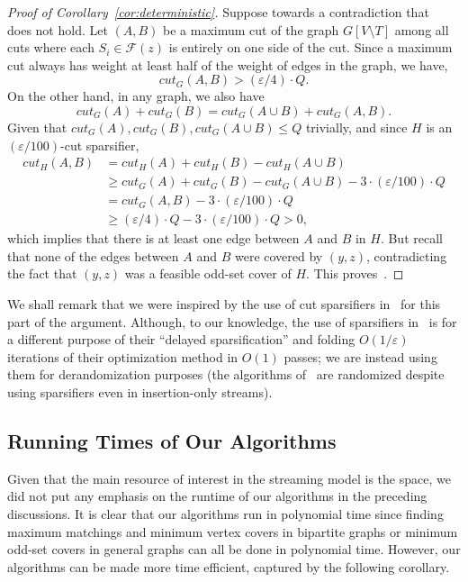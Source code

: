\documentclass{article}
\renewcommand{\leq}{\leqslant}
\renewcommand{\geq}{\geqslant}
\newcommand{\eps}{\varepsilon}
\begin{document}
\begin{proof}[Proof of Corollary~\ref{cor:deterministic}]
Suppose towards a contradiction that~ does not hold. Let $(A,B)$ be a maximum cut of the graph $G[V \setminus T]$ among all cuts where each $S_i \in \mathcal{F}(z)$ is entirely on one side of the cut. 
Since a maximum cut always has weight at least half of the weight of edges in the graph, we have, 
\[
	cut_G(A,B) > (\eps/4) \cdot Q.  
\]
On the other hand, in any graph, we also have
\[
	cut_G(A) + cut_G(B) = cut_G(A \cup B) + cut_G(A, B). 
\]
Given that $cut_G(A),cut_G(B),cut_G(A \cup B) \leq Q$ trivially, and since $H$ is an $(\eps/100)$-cut sparsifier, 
\begin{align*}
	cut_H(A,B) &= cut_H(A) + cut_H(B) - cut_H(A \cup B) \\
	&\geq cut_G(A) + cut_G(B) - cut_G(A \cup B) - 3 \cdot (\eps/100) \cdot Q \\
	&= cut_G(A,B) - 3 \cdot (\eps/100) \cdot Q \\
	&\geq (\eps/4) \cdot Q - 3 \cdot (\eps/100) \cdot Q > 0,
\end{align*}
which implies that there is at least one edge between $A$ and $B$ in $H$. But recall that none of the edges between $A$ and $B$ were covered by $(y,z)$, contradicting the fact that $(y,z)$ was a 
feasible odd-set cover of $H$. This proves~. 
\end{proof}


We shall remark that we were inspired by the use of cut sparsifiers in~\cite{AhnG15} for this part of the argument. Although, to our knowledge, the use of sparsifiers in~\cite{AhnG15} is for a different purpose
of their ``delayed sparsification'' and folding $O(1/\eps)$ iterations of their optimization method in $O(1)$ passes; we are instead using them for derandomization purposes (the algorithms of~\cite{AhnG15} are randomized despite using sparsifiers even
in insertion-only streams). 



\subsection{Running Times of Our Algorithms}\label{sec:ext-runtime}

Given that the main resource of interest in the streaming model is the space, we did not put any emphasis on the runtime of our algorithms in the preceding discussions. 
It is clear that our algorithms run in polynomial time since finding maximum matchings and minimum vertex covers in bipartite graphs or minimum odd-set covers in general graphs can all
be done in polynomial time. However, our algorithms can be made more time efficient, captured by the following corollary. 
\end{document}
